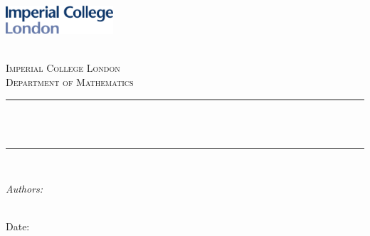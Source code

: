 \begin{titlepage}

    \newcommand{\HRule}{\rule{\linewidth}{0.5mm}} %



    \includegraphics[width = 4cm]{./figures/imperial}\\[0.5cm]

    \begin{center} %

        \textsc{\LARGE \reporttype}\\[1.5cm]
        \textsc{\Large Imperial College London}\\[0.5cm]
        \textsc{\large Department of Mathematics}\\[0.5cm]

        \HRule \\[0.4cm]
        { \huge \bfseries \reporttitle}\\ %
        \HRule \\[1.5cm]
    \end{center}

    \begin{flushleft}
        \large
        \textit{Authors:}\\
        \reportauthor~ %
    \end{flushleft}
    \vspace{2cm}
    \makeatletter
    Date: \@date

    \vfill %



    \makeatother


\end{titlepage}

